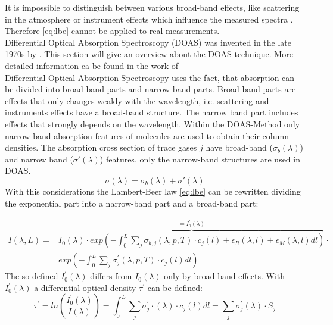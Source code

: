 \documentclass  [
  paper    = a4,
  BCOR     = 10mm,
  twoside,
  fontsize = 12pt,
  fleqn,
  toc      = bibnumbered,
  toc      = listofnumbered,
  numbers  = noendperiod,
  headings = normal,
  listof   = leveldown,
  version  = 3.03
]                                       {scrreprt}
\begin{document}
	It is impossible to distinguish between various broad-band effects, like scattering in the atmosphere or instrument effects which influence the measured spectra \cite{lubcke2014optical}. Therefore \cref{eq:lbe} cannot be applied to real measurements.\\
	Differential Optical Absorption Spectroscopy (DOAS) was invented in the late 1970s by \cite{perner1979detection}. This section will give an overview about the DOAS technique. More detailed information ca be found in the work of \cite{platt2008differential}\\
	\newline
	Differential Optical Absorption Spectroscopy uses the fact, that absorption can be divided into broad-band parts and narrow-band parts. Broad band parts are effects that only changes weakly with the wavelength,  i.e. scattering and instruments effects have a broad-band structure. 
	The narrow band part includes effects that strongly depends on the wavelength.
	Within the DOAS-Method only narrow-band absorption features of molecules are used to obtain their column densities.
	The absorption cross section of trace gases $j$ have broad-band ($\sigma_b\left(\lambda \right)$) and narrow band ($\sigma{'}\left(\lambda \right)$) features, only the narrow-band structures are used in DOAS.
	\begin{equation}
	\sigma\left(\lambda \right) = \sigma_b\left(\lambda \right) + \sigma{'}\left(\lambda \right)
	\end{equation}
	With this considerations the Lambert-Beer law \cref{eq:lbe} can be rewritten
	dividing the exponential part into a narrow-band part and a broad-band part:

	\begin{align}
	I\left(\lambda,L\right) = &\overbrace{I_{0}\left(\lambda\right)\cdot exp\left(-\int^{L}_{0}\sum_{j}\sigma_{b,j}\left(\lambda,p,T\right)\cdot c_{j}\left(l\right)+\epsilon_R\left(\lambda,l\right)+\epsilon_{M}\left(\lambda,l\right)dl\right)}^{=I^{'}_0\left(\lambda\right)} \cdot \nonumber \\
	&exp\left(-\int^{L}_{0}\sum_{j}\sigma_{j}^{'}\left(\lambda,p,T\right)\cdot c_{j}\left(l\right)dl\right)
	\label{eq:bb}
	\end{align}	
	The so defined $I^{'}_0\left(\lambda\right)$ differs from $I_0\left(\lambda\right)$ only by broad band effects. With $I^{'}_0\left(\lambda\right)$ a differential optical density $\tau^{'}$ can be defined:
	\begin{equation}
	\tau^{'} = ln\left(\frac{I^{'}_0\left(\lambda\right)}{I\left(\lambda\right)}\right) = \int_{0}^{L} \sum_{j} \sigma^{'}_{j} \cdot \left(\lambda\right) \cdot c_{j}\left(l\right)dl = \sum_{j}\sigma^{'}_{j}\left(\lambda\right)\cdot S_{j}
	\label{eq:taustrich}
	\end{equation}
	
\end{document}
